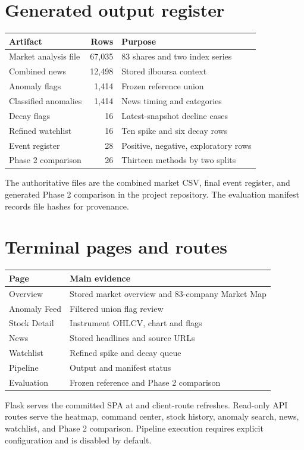 \section{Generated output register}
\begin{table}[htbp]\centering
\begin{tabularx}{\textwidth}{@{}XrX@{}}\toprule
Artifact & Rows & Purpose\\\midrule
Market analysis file & 67,035 & 83 shares and two index series\\
Combined news & 12,498 & Stored ilboursa context\\
Anomaly flags & 1,414 & Frozen reference union\\
Classified anomalies & 1,414 & News timing and categories\\
Decay flags & 16 & Latest-snapshot decline cases\\
Refined watchlist & 16 & Ten spike and six decay rows\\
Event register & 28 & Positive, negative, exploratory rows\\
Phase 2 comparison & 26 & Thirteen methods by two splits\\
\bottomrule\end{tabularx}
\end{table}
The authoritative files are the combined market CSV, final event register,
and generated Phase 2 comparison in the project repository.
The evaluation manifest records file hashes for provenance.

\section{Terminal pages and routes}
\begin{table}[htbp]\centering
\begin{tabularx}{\textwidth}{@{}lX@{}}\toprule
Page & Main evidence\\\midrule
Overview & Stored market overview and 83-company Market Map\\
Anomaly Feed & Filtered union flag review\\
Stock Detail & Instrument OHLCV, chart and flags\\
News & Stored headlines and source URLs\\
Watchlist & Refined spike and decay queue\\
Pipeline & Output and manifest status\\
Evaluation & Frozen reference and Phase 2 comparison\\
\bottomrule\end{tabularx}
\end{table}
Flask serves the committed SPA at \code{/} and client-route refreshes.
Read-only API routes serve the heatmap, command center, stock history,
anomaly search, news, watchlist, and Phase 2 comparison.
Pipeline execution requires explicit configuration and is disabled by
default.

